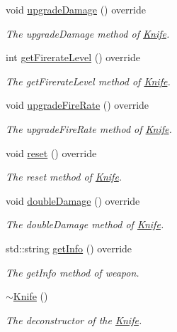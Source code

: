 \begin{DoxyCompactItemize}
void \hyperlink{class_knife_ad4a30cd292cabb9dd1d2638f893040b8}{upgrade\+Damage} () override
\begin{DoxyCompactList}\small\item\em The upgrade\+Damage method of \hyperlink{class_knife}{Knife}. \end{DoxyCompactList}\item 
int \hyperlink{class_knife_aaee97b167b530dafa85d8bead3403a10}{get\+Firerate\+Level} () override
\begin{DoxyCompactList}\small\item\em The get\+Firerate\+Level method of \hyperlink{class_knife}{Knife}. \end{DoxyCompactList}\item 
void \hyperlink{class_knife_a9c89877c20a19190103f8b5da013efb5}{upgrade\+Fire\+Rate} () override
\begin{DoxyCompactList}\small\item\em The upgrade\+Fire\+Rate method of \hyperlink{class_knife}{Knife}. \end{DoxyCompactList}\item 
void \hyperlink{class_knife_ad33b6b16ba209474ef0211317fce057b}{reset} () override
\begin{DoxyCompactList}\small\item\em The reset method of \hyperlink{class_knife}{Knife}. \end{DoxyCompactList}\item 
void \hyperlink{class_knife_aa32f6d087a7451a319c640652006a528}{double\+Damage} () override
\begin{DoxyCompactList}\small\item\em The double\+Damage method of \hyperlink{class_knife}{Knife}. \end{DoxyCompactList}\item 
std\+::string \hyperlink{class_knife_aa0d13d7ea1113f3dbd177c65acec9e87}{get\+Info} () override
\begin{DoxyCompactList}\small\item\em The get\+Info method of weapon. \end{DoxyCompactList}\item 
\hyperlink{class_knife_aba6d0d191765285bb5993a6c2f02046e}{$\sim$\+Knife} ()
\begin{DoxyCompactList}\small\item\em The deconstructor of the \hyperlink{class_knife}{Knife}. \end{DoxyCompactList}\end{DoxyCompactItemize}
